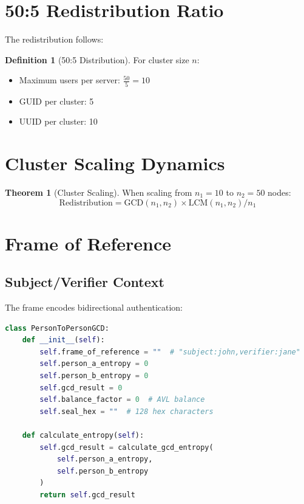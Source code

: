 \documentclass[12pt,a4paper]{report}
\theoremstyle{definition}
\newtheorem{definition}{Definition}[chapter]
\newtheorem{theorem}{Theorem}[chapter]
\begin{document}
\section{50:5 Redistribution Ratio}

The redistribution follows:

\begin{definition}[50:5 Distribution]
For cluster size $n$:
\begin{itemize}
    \item Maximum users per server: $\frac{50}{5} = 10$
    \item GUID per cluster: 5
    \item UUID per cluster: 10
\end{itemize}
\end{definition}

\section{Cluster Scaling Dynamics}

\begin{theorem}[Cluster Scaling]
When scaling from $n_1 = 10$ to $n_2 = 50$ nodes:
$$\text{Redistribution} = \text{GCD}(n_1, n_2) \times \text{LCM}(n_1, n_2) / n_1$$
\end{theorem}

\section{Frame of Reference}

\subsection{Subject/Verifier Context}

The frame encodes bidirectional authentication:

\begin{lstlisting}[language=Python, caption=Frame of Reference Structure]
class PersonToPersonGCD:
    def __init__(self):
        self.frame_of_reference = ""  # "subject:john,verifier:jane"
        self.person_a_entropy = 0
        self.person_b_entropy = 0
        self.gcd_result = 0
        self.balance_factor = 0  # AVL balance
        self.seal_hex = ""  # 128 hex characters
        
    def calculate_entropy(self):
        self.gcd_result = calculate_gcd_entropy(
            self.person_a_entropy,
            self.person_b_entropy
        )
        return self.gcd_result
\end{lstlisting}
\end{document}
